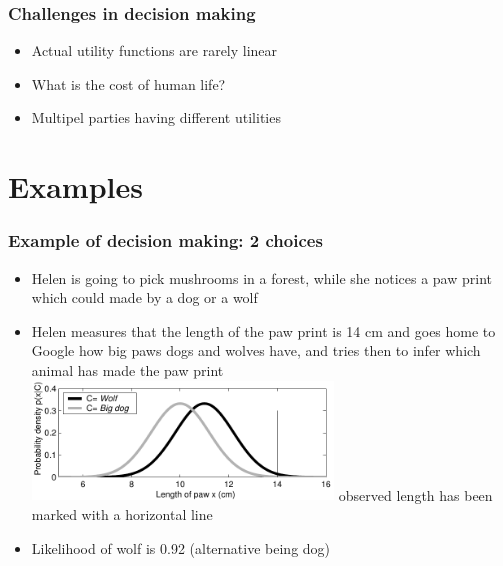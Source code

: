 \documentclass[10pt,handout]{beamer}
\begin{document}
\begin{frame}

\frametitle{Challenges in decision making}

  \begin{itemize}
  \item Actual utility functions are rarely linear
  \item<2-> What is the cost of human life?
  \item<3-> Multipel parties having different utilities
  \end{itemize}

\end{frame}

\section{Examples}
\frame{\sectionpage}

\begin{frame}

\frametitle{Example of decision making: 2 choices}

\begin{itemize}
\item<+-> Helen is going to pick mushrooms in a forest, while she notices a paw print which could made by a dog or a wolf
\item<+-> Helen measures that the length of the paw print is 14 cm and
  goes home to Google how big paws dogs and wolves have, and tries
  then to infer which animal has made the paw print
  \includegraphics[width=8cm]{figs/hatutus_likelihoods}
  observed length has been marked with a horizontal line
\item<+-> Likelihood of wolf is 0.92 (alternative being dog)
\end{itemize}

\end{frame}
\end{document}
